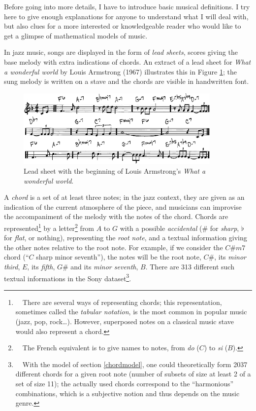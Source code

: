 \documentclass[a4paper,10pt]{article}
\newcommand{\guill}[1]{“#1”}
\begin{document}
Before going into more details, I have to introduce basic musical definitions. I try here to give enough explanations for anyone to understand what I will deal with, but also clues for a more interested or knowledgeable reader who would like to get a glimpse of mathematical models of music.

In jazz music, songs are displayed in the form of \emph{lead sheets}, scores giving the base melody with extra indications of chords. An extract of a lead sheet for \emph{What a wonderful world} by Louis Armstrong (1967) illustrates this in Figure \ref{waww}; the sung melody is written on a stave and the chords are visible in handwritten font.

\begin{figure}[h!]
\centering
\includegraphics[width=10cm]{images/waww.jpg}
\caption{Lead sheet with the beginning of Louis Armstrong's \emph{What a wonderful world}.\label{waww}}
\end{figure}

A \emph{chord} is a set of at least three notes; in the jazz context, they are given as an indication of the current atmosphere of the piece, and musicians can improvise the accompaniment of the melody with the notes of the chord. Chords are represented\footnote{~~There are several ways of representing chords; this representation, sometimes called the \emph{tabular notation}, is the most common in popular music (jazz, pop, rock\dots). However, superposed notes on a classical music stave would also represent a chord.} 
by a letter\footnote{~~The French equivalent is to give names to notes, from \emph{do} ($C$) to \emph{si} ($B$).} from $A$ to $G$ 
with a possible \emph{accidental} ($\#$ for \emph{sharp}, $\flat$ for \emph{flat}, or nothing), representing the \emph{root note}, and a textual information giving the other notes relative to the root note. For example, if we consider the $C\#m7$ chord (\guill{$C$ sharp minor seventh}), the notes will be the root note, $C\#$, its \emph{minor third}, $E$, its \emph{fifth}, $G\#$ and its \emph{minor seventh}, $B$. There are 313 different such textual informations in the Sony dataset\footnote{~~With the model of section \ref{chordmodel}, one could theoretically form 2037 different chords for a given root note (number of subsets of size at least 2 of a set of size 11); the actually used chords correspond to the \guill{harmonious} combinations, which is a subjective notion and thus depends on the music genre.}.
\end{document}
